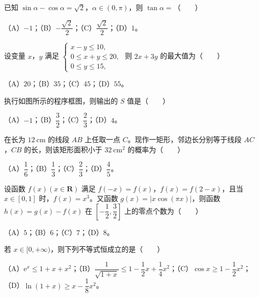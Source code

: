 \begin{question}
已知 $\sin\alpha-\cos\alpha=\sqrt2$，$\alpha\in(0,\pi)$，则 $\tan\alpha=$\mbox{（　　）}

（A）$-1$；（B）$-\dfrac{\sqrt2}{2}$；（C）$\dfrac{\sqrt2}{2}$；（D）$1$。

\end{question}
\begin{question}
设变量 $x$，$y$ 满足 $\begin{cases}x-y\leqslant 10,\\0\leqslant x+y\leqslant 20,\\0\leqslant y\leqslant 15,\end{cases}$ 则 $2x+3y$ 的最大值为\mbox{（　　）}

（A）$20$；（B）$35$；（C）$45$；（D）$55$。

\Needspace{0.4\textheight}
\end{question}
\begin{question}
执行如图所示的程序框图，则输出的 $S$ 值是\mbox{（　　）}
\nopagebreak[4]
\begin{center}\end{center}
\nopagebreak[4]
（A）$-1$；（B）$\dfrac32$；（C）$\dfrac23$；（D）$4$。

\end{question}
\begin{question}
在长为 $12\ \mathrm{cm}$ 的线段 $AB$ 上任取一点 $C$。现作一矩形，邻边长分别等于线段 $AC$，$CB$ 的长，则该矩形面积小于 $32\ \mathrm{cm}^2$ 的概率为\mbox{（　　）}

（A）$\dfrac16$；（B）$\dfrac13$；（C）$\dfrac23$；（D）$\dfrac45$。

\end{question}
\begin{question}
设函数 $f(x)(x\in\mathbf R)$ 满足 $f(-x)=f(x)$，$f(x)=f(2-x)$，且当 $x\in[0,1]$ 时，$f(x)=x^3$。又函数 $g(x)=|x\cos(\pi x)|$，则函数 $h(x)=g(x)-f(x)$ 在 $\left[-\dfrac12,\dfrac32\right]$ 上的零点个数为\mbox{（　　）}

（A）$5$；（B）$6$；（C）$7$；（D）$8$。

\end{question}
\begin{question}
若 $x\in[0,+\infty)$，则下列不等式恒成立的是\mbox{（　　）}

（A）$\mathrm e^x\leqslant 1+x+x^2$；（B）$\dfrac1{\sqrt{1+x}}\leqslant 1-\dfrac12x+\dfrac14x^2$；（C）$\cos x\geqslant 1-\dfrac12x^2$；（D）$\ln(1+x)\geqslant x-\dfrac18x^2$。

\end{question}

